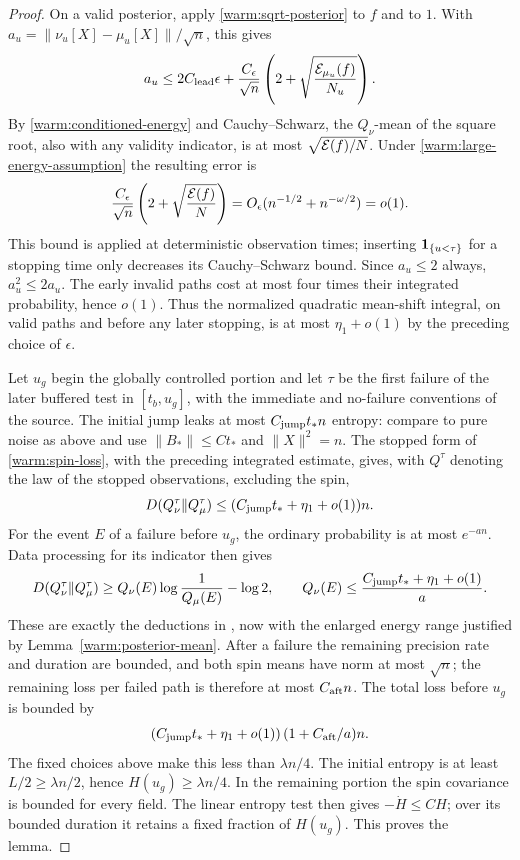 \begin{proof}
On a valid posterior, apply \eqref{warm:sqrt-posterior} to \(f\)
and to \(1\).  With
\(a_u=\|\nu_u[X]-\mu_u[X]\|/\sqrt n\), this gives
\[
 a_u\le2C_{\rm lead}\epsilon+
       \frac{C_\epsilon}{\sqrt n}
          \left(2+\sqrt{\frac{\mathcal E_{\mu_u}(f)}{N_u}}\right).
\]
By \eqref{warm:conditioned-energy} and Cauchy--Schwarz, the
\(Q_\nu\)-mean of the square root, also with any validity indicator,
is at most \(\sqrt{\mathcal E(f)/N}\).  Under
\eqref{warm:large-energy-assumption} the resulting error is
\[
 \frac{C_\epsilon}{\sqrt n}
       \left(2+\sqrt{\frac{\mathcal E(f)}N}\right)
       =O_\epsilon(n^{-1/2}+n^{-\omega/2})=o(1).
\]
This bound is applied at deterministic observation times; inserting
\(\mathbf 1_{\{u<\tau\}}\) for a stopping time only decreases its
Cauchy--Schwarz bound.  Since \(a_u\le2\) always, \(a_u^2\le2a_u\).
The early invalid paths cost at most four times their integrated
probability, hence \(o(1)\).  Thus the normalized quadratic
mean-shift integral, on valid paths and before any later stopping,
is at most \(\eta_1+o(1)\) by the preceding choice of \(\epsilon\).

Let \(u_g\) begin the globally controlled portion and let \(\tau\)
be the first failure of the later buffered test in \([t_b,u_g]\),
with the immediate and no-failure conventions of the source.  The
initial jump leaks at most \(C_{\rm jump}t_*n\) entropy: compare to pure noise
as above and use \(\|B_*\|\le Ct_*\) and \(\|X\|^2=n\).
The stopped form of \eqref{warm:spin-loss}, with the preceding
integrated estimate, gives, with \(Q^\tau\) denoting the law of the
stopped observations, excluding the spin,
\begin{equation}
 D(Q_\nu^\tau\Vert Q_\mu^\tau)
       \le(C_{\rm jump}t_*+\eta_1+o(1))n .              \label{warm:stopped-entropy}
\end{equation}
For the event \(E\) of a failure before \(u_g\), the ordinary
probability is at most \(e^{-an}\).  Data processing for its indicator
then gives
\[
 D(Q_\nu^\tau\Vert Q_\mu^\tau)
 \ge Q_\nu(E)\log\frac1{Q_\mu(E)}-\log2,\qquad
 Q_\nu(E)\le\frac{C_{\rm jump}t_*+\eta_1+o(1)}a .
\]
These are exactly the deductions in
\cite[Equations~(19.21)--(19.22)]{CM}, now with the enlarged energy
range justified by Lemma~\ref{warm:posterior-mean}.
After a failure the remaining precision rate and duration are bounded,
and both spin means have norm at most \(\sqrt n\); the remaining
loss per failed path is therefore at most \(C_{\rm aft}n\).  The total loss
before \(u_g\) is bounded by
\[
 \left(C_{\rm jump}t_*+\eta_1+o(1)\right)
       (1+C_{\rm aft}/a)n .
\]
The fixed choices above make this less than \(\lambda n/4\).
The initial entropy is at least \(L/2\ge\lambda n/2\), hence
\(H(u_g)\ge\lambda n/4\).  In the remaining portion the spin
covariance is bounded for every field.  The linear entropy test
then gives \(-\dot H\le CH\); over its bounded duration it retains
a fixed fraction of \(H(u_g)\).  This proves the lemma.
\end{proof}

